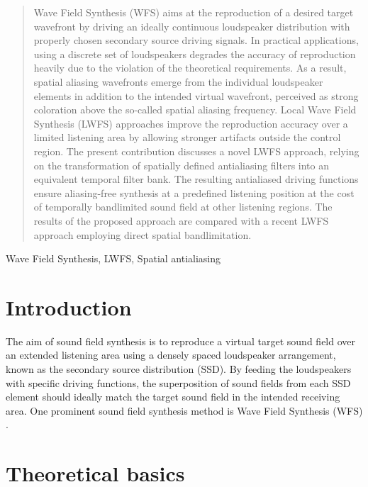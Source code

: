\documentclass[conference]{IEEEtran}
\begin{document}
\begin{abstract}
    Wave Field Synthesis (WFS) aims at the reproduction of a desired target wavefront by driving an ideally continuous loudspeaker distribution with properly chosen secondary source driving signals.
    In practical applications, using a discrete set of loudspeakers degrades the accuracy of reproduction heavily due to the violation of the theoretical requirements.
    As a result, spatial aliasing wavefronts emerge from the individual loudspeaker elements in addition to the intended virtual wavefront, perceived as strong coloration above the so-called spatial aliasing frequency.
    Local Wave Field Synthesis (LWFS) approaches improve the reproduction accuracy over a limited listening area by allowing stronger artifacts outside the control region.
    The present contribution discusses a novel LWFS approach, relying on the transformation of spatially defined antialiasing filters into an equivalent temporal filter bank.
    The resulting antialiased driving functions ensure aliasing-free synthesis at a predefined listening position at the cost of temporally bandlimited sound field at other listening regions.
    The results of the proposed approach are compared with a recent LWFS approach employing direct spatial bandlimitation.
\end{abstract}

\begin{IEEEkeywords}
    Wave Field Synthesis, LWFS, Spatial antialiasing
\end{IEEEkeywords}

\section{Introduction}
The aim of sound field synthesis is to reproduce a virtual target sound field over an extended listening area using a densely spaced loudspeaker arrangement, known as the secondary source distribution (SSD).
By feeding the loudspeakers with specific driving functions, the superposition of sound fields from each SSD element should ideally match the target sound field in the intended receiving area.
One prominent sound field synthesis method is Wave Field Synthesis (WFS) \cite{Berkhout1993:Acoustic_control_by_WFS, Start1997:phd}.%

\section{Theoretical basics}
\end{document}
